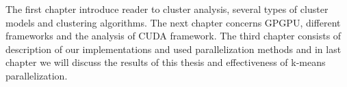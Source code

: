 

The first chapter introduce reader to cluster analysis, several types of cluster models and clustering algorithms. The next chapter concerns GPGPU, different frameworks and the analysis of CUDA framework. The third chapter consists of description of our implementations and used parallelization methods and in last chapter we will discuss the results of this thesis and effectiveness of k-means parallelization. 